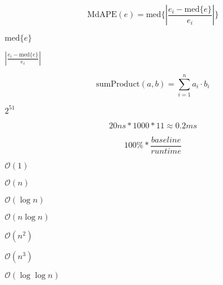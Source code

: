 \documentclass{article}
\begin{document}
\[ \mathrm{MdAPE}(e) = \mathrm{med}\{| \frac{e_i - \mathrm{med}\{e\}}{e_i}| \} \]
\pagebreak

$ \mathrm{med}\{e\} $
\pagebreak

$ | \frac{e_i - \mathrm{med}\{e\}}{e_i}| $
\pagebreak

\[ \mathrm{sumProduct}(a,b) = \sum_{i=1}^{n}a_i\cdot b_i \]
\pagebreak

$ 2^{51} $
\pagebreak

\[ 20ns * 1000 * 11 \approx 0.2ms \]
\pagebreak

\[ 100\% * \frac{baseline}{runtime} \]
\pagebreak

$ \mathcal{O}(1) $
\pagebreak

$ \mathcal{O}(n) $
\pagebreak

$ \mathcal{O}(\log{}n) $
\pagebreak

$ \mathcal{O}(n\log{}n) $
\pagebreak

$ \mathcal{O}(n^2) $
\pagebreak

$ \mathcal{O}(n^3) $
\pagebreak

$ \mathcal{O}(\log{}\log{}n) $
\pagebreak
\end{document}
